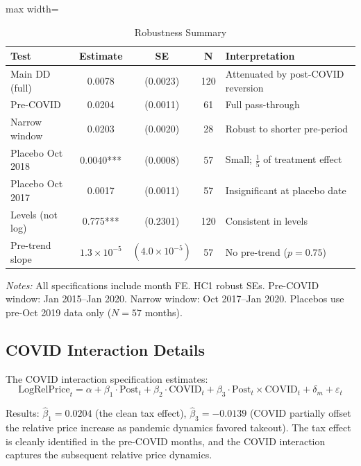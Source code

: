 \documentclass[12pt]{article}
\begin{document}
\begin{table}[H]
\centering
\caption{Robustness Summary}
\begin{threeparttable}
\begin{adjustbox}{max width=\textwidth}
\begin{tabular}{lcccp{4cm}}
\toprule
Test & Estimate & SE & N & Interpretation \\
\midrule
Main DD (full) & 0.0078 & (0.0023) & 120 & Attenuated by post-COVID reversion \\
Pre-COVID & 0.0204 & (0.0011) & 61 & Full pass-through \\
Narrow window & 0.0203 & (0.0020) & 28 & Robust to shorter pre-period \\
Placebo Oct 2018 & 0.0040*** & (0.0008) & 57 & Small; $\frac{1}{5}$ of treatment effect \\
Placebo Oct 2017 & 0.0017 & (0.0011) & 57 & Insignificant at placebo date \\
Levels (not log) & 0.775*** & (0.2301) & 120 & Consistent in levels \\
Pre-trend slope & $1.3 \times 10^{-5}$ & $(4.0 \times 10^{-5})$ & 57 & No pre-trend ($p = 0.75$) \\
\bottomrule
\end{tabular}
\end{adjustbox}
\begin{tablenotes}[flushleft]
\small
\item \textit{Notes:} All specifications include month FE. HC1 robust SEs. Pre-COVID window: Jan 2015--Jan 2020. Narrow window: Oct 2017--Jan 2020. Placebos use pre-Oct 2019 data only ($N = 57$ months).
\end{tablenotes}
\end{threeparttable}
\label{tab:robustness}
\end{table}

\subsection{COVID Interaction Details}

The COVID interaction specification estimates:
\begin{equation}
\text{LogRelPrice}_t = \alpha + \beta_1 \cdot \text{Post}_t + \beta_2 \cdot \text{COVID}_t + \beta_3 \cdot \text{Post}_t \times \text{COVID}_t + \delta_m + \varepsilon_t
\end{equation}

Results: $\hat{\beta}_1 = 0.0204$ (the clean tax effect), $\hat{\beta}_3 = -0.0139$ (COVID partially offset the relative price increase as pandemic dynamics favored takeout). The tax effect is cleanly identified in the pre-COVID months, and the COVID interaction captures the subsequent relative price dynamics.
\end{document}
